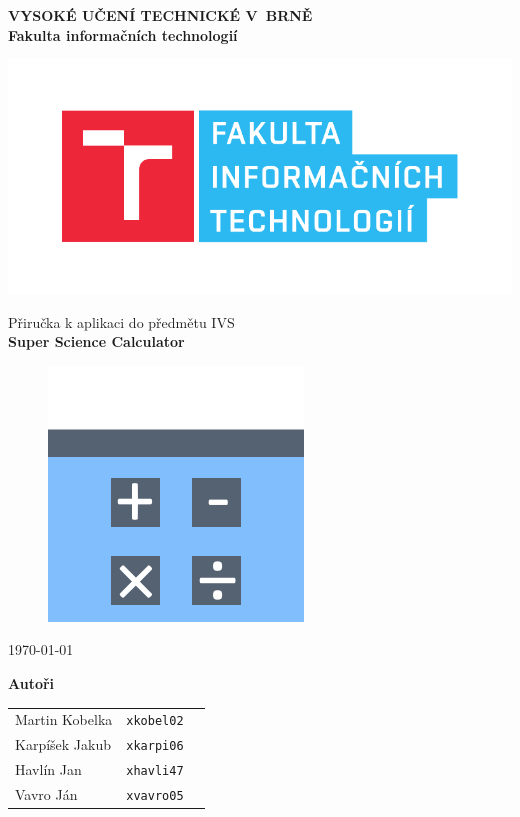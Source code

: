\begin{titlepage}

    \centering

    {\fontsize{20pt}{15pt}\bfseries
    VYSOKÉ UČENÍ TECHNICKÉ V~BRNĚ\\
    \vspace{8pt}
    Fakulta informačních technologií
    }


    \includegraphics[scale=0.7]{./assets/fit-logo.pdf}

    \vspace{22pt}

    {\Large Přiručka k aplikaci do předmětu IVS\\}
    \vspace{40pt}
    {\Large \bfseries Super Science Calculator\\}
    
    \begin{figure}[h]
    \centering
    \includegraphics[scale=0.5]{./assets/icon.png}
    \end{figure}
    \vspace{10pt}
    {\Large \today}

    \vspace{90pt}
    {\Large \bfseries Autoři\\}
    \vspace{12pt}

    \begin{tabular}{ l c r }
        Martin Kobelka & \texttt{xkobel02} \\
        Karpíšek Jakub & \texttt{xkarpi06} \\
        Havlín Jan & \texttt{xhavli47} \\
        Vavro Ján & \texttt{xvavro05} \\
    \end{tabular}\\

\end{titlepage}